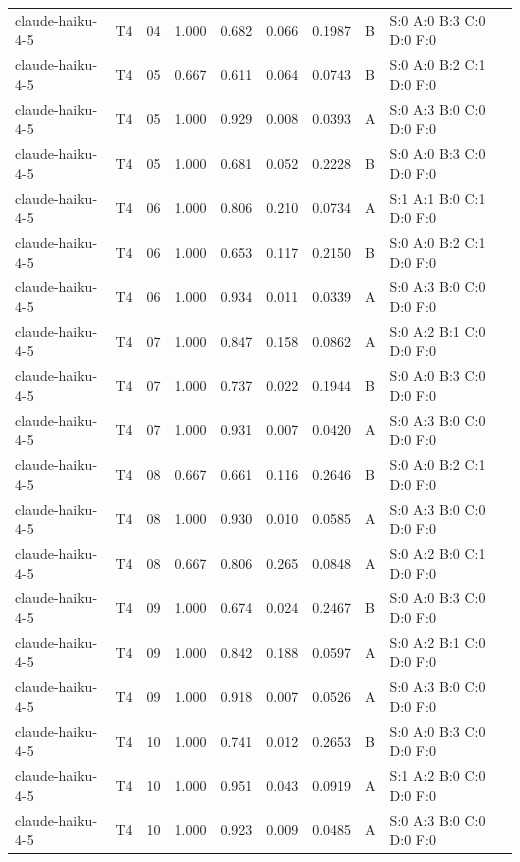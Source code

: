 \begin{longtable}{llrrrrrll}
claude-haiku-4-5 & T4 & 04 & 1.000 & 0.682 & 0.066 & 0.1987 & B & \tiny S:0 A:0 B:3 C:0 D:0 F:0 \\
claude-haiku-4-5 & T4 & 05 & 0.667 & 0.611 & 0.064 & 0.0743 & B & \tiny S:0 A:0 B:2 C:1 D:0 F:0 \\
claude-haiku-4-5 & T4 & 05 & 1.000 & 0.929 & 0.008 & 0.0393 & A & \tiny S:0 A:3 B:0 C:0 D:0 F:0 \\
claude-haiku-4-5 & T4 & 05 & 1.000 & 0.681 & 0.052 & 0.2228 & B & \tiny S:0 A:0 B:3 C:0 D:0 F:0 \\
claude-haiku-4-5 & T4 & 06 & 1.000 & 0.806 & 0.210 & 0.0734 & A & \tiny S:1 A:1 B:0 C:1 D:0 F:0 \\
claude-haiku-4-5 & T4 & 06 & 1.000 & 0.653 & 0.117 & 0.2150 & B & \tiny S:0 A:0 B:2 C:1 D:0 F:0 \\
claude-haiku-4-5 & T4 & 06 & 1.000 & 0.934 & 0.011 & 0.0339 & A & \tiny S:0 A:3 B:0 C:0 D:0 F:0 \\
claude-haiku-4-5 & T4 & 07 & 1.000 & 0.847 & 0.158 & 0.0862 & A & \tiny S:0 A:2 B:1 C:0 D:0 F:0 \\
claude-haiku-4-5 & T4 & 07 & 1.000 & 0.737 & 0.022 & 0.1944 & B & \tiny S:0 A:0 B:3 C:0 D:0 F:0 \\
claude-haiku-4-5 & T4 & 07 & 1.000 & 0.931 & 0.007 & 0.0420 & A & \tiny S:0 A:3 B:0 C:0 D:0 F:0 \\
claude-haiku-4-5 & T4 & 08 & 0.667 & 0.661 & 0.116 & 0.2646 & B & \tiny S:0 A:0 B:2 C:1 D:0 F:0 \\
claude-haiku-4-5 & T4 & 08 & 1.000 & 0.930 & 0.010 & 0.0585 & A & \tiny S:0 A:3 B:0 C:0 D:0 F:0 \\
claude-haiku-4-5 & T4 & 08 & 0.667 & 0.806 & 0.265 & 0.0848 & A & \tiny S:0 A:2 B:0 C:1 D:0 F:0 \\
claude-haiku-4-5 & T4 & 09 & 1.000 & 0.674 & 0.024 & 0.2467 & B & \tiny S:0 A:0 B:3 C:0 D:0 F:0 \\
claude-haiku-4-5 & T4 & 09 & 1.000 & 0.842 & 0.188 & 0.0597 & A & \tiny S:0 A:2 B:1 C:0 D:0 F:0 \\
claude-haiku-4-5 & T4 & 09 & 1.000 & 0.918 & 0.007 & 0.0526 & A & \tiny S:0 A:3 B:0 C:0 D:0 F:0 \\
claude-haiku-4-5 & T4 & 10 & 1.000 & 0.741 & 0.012 & 0.2653 & B & \tiny S:0 A:0 B:3 C:0 D:0 F:0 \\
claude-haiku-4-5 & T4 & 10 & 1.000 & 0.951 & 0.043 & 0.0919 & A & \tiny S:1 A:2 B:0 C:0 D:0 F:0 \\
claude-haiku-4-5 & T4 & 10 & 1.000 & 0.923 & 0.009 & 0.0485 & A & \tiny S:0 A:3 B:0 C:0 D:0 F:0 \\

\end{longtable}
